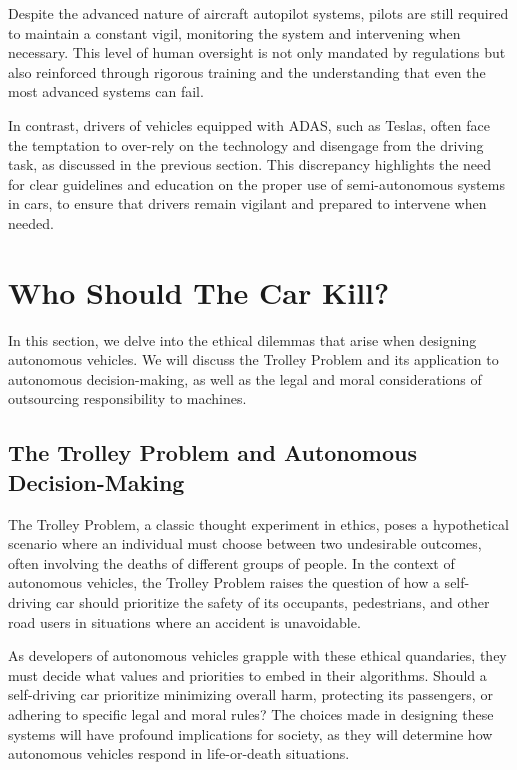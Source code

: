 Despite the advanced nature of aircraft autopilot systems, pilots are still required to maintain a constant vigil, monitoring the system and intervening when necessary. This level of human oversight is not only mandated by regulations but also reinforced through rigorous training and the understanding that even the most advanced systems can fail.

In contrast, drivers of vehicles equipped with ADAS, such as Teslas, often face the temptation to over-rely on the technology and disengage from the driving task, as discussed in the previous section. This discrepancy highlights the need for clear guidelines and education on the proper use of semi-autonomous systems in cars, to ensure that drivers remain vigilant and prepared to intervene when needed.

\section{Who Should The Car Kill?}

In this section, we delve into the ethical dilemmas that arise when designing autonomous vehicles. We will discuss the Trolley Problem and its application to autonomous decision-making, as well as the legal and moral considerations of outsourcing responsibility to machines.

\subsection{The Trolley Problem and Autonomous Decision-Making}

The Trolley Problem, a classic thought experiment in ethics, poses a hypothetical scenario where an individual must choose between two undesirable outcomes, often involving the deaths of different groups of people. In the context of autonomous vehicles, the Trolley Problem raises the question of how a self-driving car should prioritize the safety of its occupants, pedestrians, and other road users in situations where an accident is unavoidable.

As developers of autonomous vehicles grapple with these ethical quandaries, they must decide what values and priorities to embed in their algorithms. Should a self-driving car prioritize minimizing overall harm, protecting its passengers, or adhering to specific legal and moral rules? The choices made in designing these systems will have profound implications for society, as they will determine how autonomous vehicles respond in life-or-death situations.

